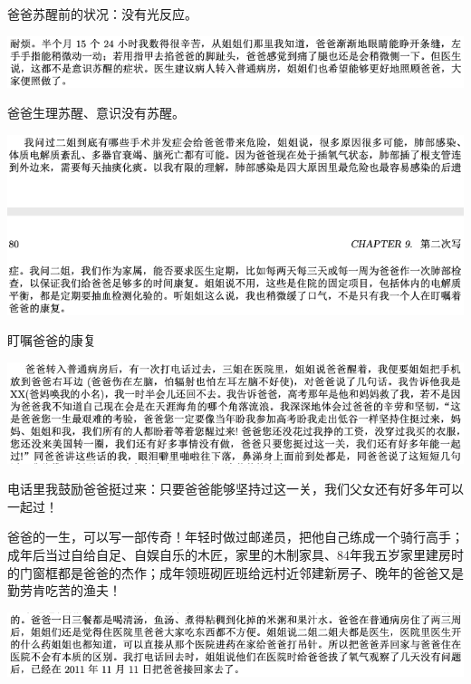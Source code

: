 \documentclass[9pt, b5paper]{article}
\begin{document}
爸爸苏醒前的状况：没有光反应。

\begin{center}
\includegraphics[width=.9\linewidth]{./pic/backups_plans_20210416_161213.png}
\end{center}

爸爸生理苏醒、意识没有苏醒。

\begin{center}
\includegraphics[width=.9\linewidth]{./pic/backups_plans_20210416_161400.png}
\end{center}

盯嘱爸爸的康复

\begin{center}
\includegraphics[width=.9\linewidth]{./pic/backups_plans_20210416_161542.png}
\end{center}

电话里我鼓励爸爸挺过来：只要爸爸能够坚持过这一关，我们父女还有好多年可以一起过！

爸爸的一生，可以写一部传奇！年轻时做过邮递员，把他自己练成一个骑行高手；成年后当过自给自足、自娱自乐的木匠，家里的木制家具、84年我五岁家里建房时的门窗框都是爸爸的杰作；成年领班砌匠班给远村近邻建新房子、晚年的爸爸又是勤劳肯吃苦的渔夫！  

\begin{center}
\includegraphics[width=.9\linewidth]{./pic/backups_plans_20210416_162007.png}
\end{center}
\end{document}
